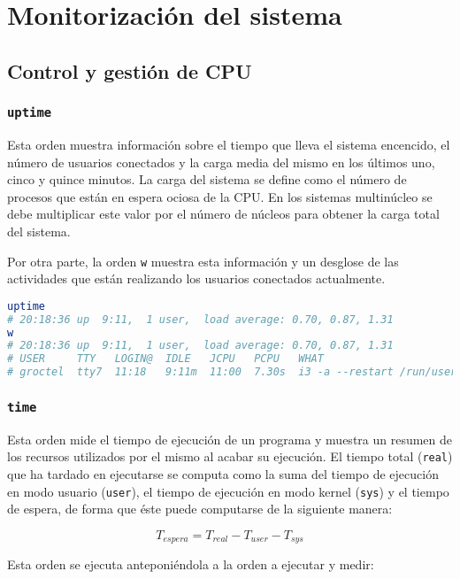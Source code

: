 \section{Monitorización del sistema}

\subsection{Control y gestión de CPU}

\subsubsection{\texttt{uptime}}

Esta orden muestra información sobre el tiempo que lleva el sistema encencido, el número de usuarios conectados y la carga media del mismo en los últimos uno, cinco y quince minutos.
La carga del sistema se define como el número de procesos que están en espera ociosa de la CPU\@.
En los sistemas multinúcleo se debe multiplicar este valor por el número de núcleos para obtener la carga total del sistema.

Por otra parte, la orden \texttt{w} muestra esta información y un desglose de las actividades que están realizando los usuarios conectados actualmente.

\begin{lstlisting}[language=Bash]
uptime
# 20:18:36 up  9:11,  1 user,  load average: 0.70, 0.87, 1.31
w
# 20:18:36 up  9:11,  1 user,  load average: 0.70, 0.87, 1.31
# USER     TTY   LOGIN@  IDLE   JCPU   PCPU   WHAT
# groctel  tty7  11:18   9:11m  11:00  7.30s  i3 -a --restart /run/user/1000/i3/restart-state.1608
\end{lstlisting}

\subsubsection{\texttt{time}}

Esta orden mide el tiempo de ejecución de un programa y muestra un resumen de los recursos utilizados por el mismo al acabar su ejecución.
El tiempo total (\texttt{real}) que ha tardado en ejecutarse se computa como la suma del tiempo de ejecución en modo usuario (\texttt{user}), el tiempo de ejecución en modo kernel (\texttt{sys}) y el tiempo de espera, de forma que éste puede computarse de la siguiente manera:

\[T_{espera}=T_{real}-T_{user}-T_{sys}\]

Esta orden se ejecuta anteponiéndola a la orden a ejecutar y medir:

